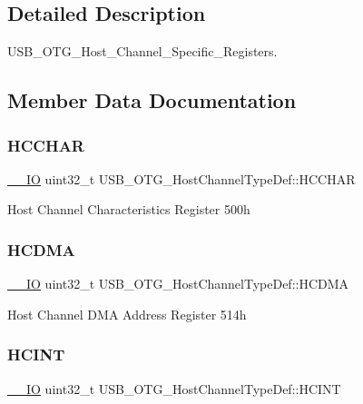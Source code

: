 \subsection{Detailed Description}
U\+S\+B\+\_\+\+O\+T\+G\+\_\+\+Host\+\_\+\+Channel\+\_\+\+Specific\+\_\+\+Registers. 

\subsection{Member Data Documentation}
\mbox{\label{struct_u_s_b___o_t_g___host_channel_type_def_a6f1e046a654010fb0da5eec942fb9a8d}} 
\subsubsection{\texorpdfstring{HCCHAR}{HCCHAR}}
{\footnotesize\ttfamily \mbox{\hyperlink{core__sc300_8h_aec43007d9998a0a0e01faede4133d6be}{\+\_\+\+\_\+\+IO}} uint32\+\_\+t U\+S\+B\+\_\+\+O\+T\+G\+\_\+\+Host\+Channel\+Type\+Def\+::\+H\+C\+C\+H\+AR}

Host Channel Characteristics Register 500h \mbox{\label{struct_u_s_b___o_t_g___host_channel_type_def_a4204a2dcbc14fb11d371fc45b9f3170f}} 
\subsubsection{\texorpdfstring{HCDMA}{HCDMA}}
{\footnotesize\ttfamily \mbox{\hyperlink{core__sc300_8h_aec43007d9998a0a0e01faede4133d6be}{\+\_\+\+\_\+\+IO}} uint32\+\_\+t U\+S\+B\+\_\+\+O\+T\+G\+\_\+\+Host\+Channel\+Type\+Def\+::\+H\+C\+D\+MA}

Host Channel D\+MA Address Register 514h \mbox{\label{struct_u_s_b___o_t_g___host_channel_type_def_a6735bbd8fbc28f897f1b44df95f52873}} 
\subsubsection{\texorpdfstring{HCINT}{HCINT}}
{\footnotesize\ttfamily \mbox{\hyperlink{core__sc300_8h_aec43007d9998a0a0e01faede4133d6be}{\+\_\+\+\_\+\+IO}} uint32\+\_\+t U\+S\+B\+\_\+\+O\+T\+G\+\_\+\+Host\+Channel\+Type\+Def\+::\+H\+C\+I\+NT}

